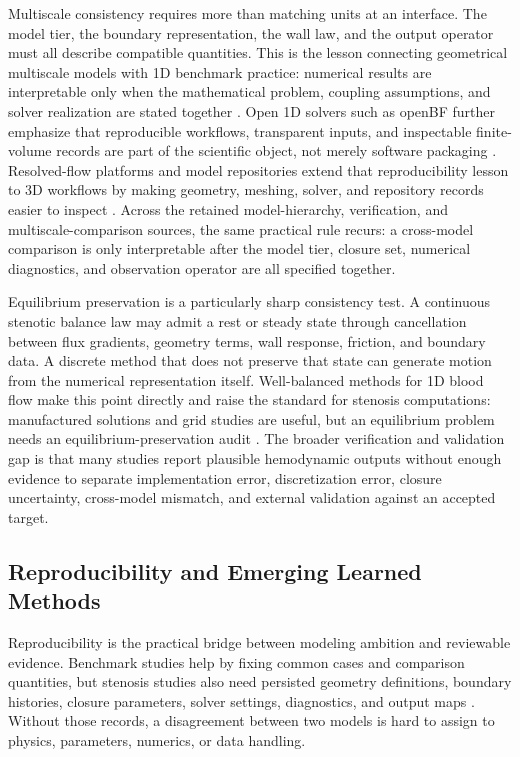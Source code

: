 Multiscale consistency requires more than matching units at an interface. The
model tier, the boundary representation, the wall law, and the output operator
must all describe compatible quantities. This is the lesson connecting
geometrical multiscale models with 1D benchmark practice: numerical results are
interpretable only when the mathematical problem, coupling assumptions, and
solver realization are stated together
\cite{QuarteroniVeneziani2003GeometricalMultiscale,BoileauEtAl2015Benchmark}.
Open 1D solvers such as openBF further emphasize that reproducible workflows,
transparent inputs, and inspectable finite-volume records are part of the
scientific object, not merely software packaging
\cite{BenemeritoEtAl2024OpenBF}.
Resolved-flow platforms and model repositories extend that reproducibility
lesson to 3D workflows by making geometry, meshing, solver, and repository
records easier to inspect \cite{SimVascular2026Platform,SimVascular2026VascularModelRepository}.
Across the retained model-hierarchy, verification, and multiscale-comparison
sources, the same practical rule recurs: a cross-model comparison is only
interpretable after the model tier, closure set, numerical diagnostics, and
observation operator are all specified together.

Equilibrium preservation is a particularly sharp consistency test. A continuous
stenotic balance law may admit a rest or steady state through cancellation
between flux gradients, geometry terms, wall response, friction, and boundary
data. A discrete method that does not preserve that state can generate motion
from the numerical representation itself. Well-balanced methods for 1D blood
flow make this point directly and raise the standard for stenosis computations:
manufactured solutions and grid studies are useful, but an equilibrium problem
needs an equilibrium-preservation audit
\cite{PimentelGarciaEtAl2025HighOrderWellBalanced}. The broader verification
and validation gap is that many studies report plausible hemodynamic outputs
without enough evidence to separate implementation error, discretization error,
closure uncertainty, cross-model mismatch, and external validation against an
accepted target.

\subsection{Reproducibility and Emerging Learned Methods}
\label{subsec:synthesis-reproducibility-learned-methods}

Reproducibility is the practical bridge between modeling ambition and reviewable
evidence. Benchmark studies help by fixing common cases and comparison
quantities, but stenosis studies also need persisted geometry definitions,
boundary histories, closure parameters, solver settings, diagnostics, and output
maps \cite{BoileauEtAl2015Benchmark,BenemeritoEtAl2024OpenBF}. Without those
records, a disagreement between two models is hard to assign to physics,
parameters, numerics, or data handling.

